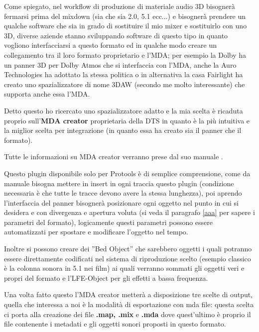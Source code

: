 \documentclass[12pt,a4paper]{report}
\begin{document}
Come spiegato, nel workflow di produzione di materiale audio 3D bisognerà fermarsi prima del mixdown (sia che sia 2.0, 5.1 ecc...) e bisognerà prendere un qualche software che sia in grado di sostituire il mio mixer e sostituirlo con uno 3D, diverse aziende stanno sviluppando software di questo tipo in quanto vogliono interfacciarsi a questo formato ed in qualche modo creare un collegamento tra il loro formato proprietario e l'MDA; per esempio la Dolby ha un panner 3D per Dolby Atmos che si interfaccia con l'MDA, anche la Auro Technologies ha adottato la stessa politica o in alternativa la casa Fairlight ha creato uno spazializzatore di nome 3DAW (secondo me molto interessante) che supporta anche essa l'MDA.

Detto questo ho ricercato uno spazializzatore adatto e la mia scelta è ricaduta proprio sull'\textbf{MDA creator} proprietaria della DTS in quanto è la più intuitiva e la miglior scelta per integrazione (in quanto essa ha creato sia il panner che il formato).

Tutte le informazioni su MDA creator verranno prese dal suo manuale \cite{creator}.

Questo plugin disponibile solo per Protools è di semplice comprensione, come da manuale bisogna mettere in insert in ogni traccia questo plugin (condizione necessaria è che tutte le tracce devono avere la stessa lunghezza), poi aprendo l'interfaccia del panner bisognerà posizionare ogni oggetto nel punto in cui si desidera e con divergenza e apertura voluta (si veda il paragrafo \ref{aaa} per sapere i parametri del formato), logicamente questi parametri possono essere automatizzati per spostare e modificare l'oggetto nel tempo.

Inoltre si possono creare dei ''Bed Object'' che sarebbero oggetti i quali potranno essere direttamente codificati nel sistema di riproduzione scelto (esempio classico è la colonna sonora in 5.1 nei film) ai quali verranno sommati gli oggetti veri e propri del formato e l'LFE-Object per gli effetti a bassa frequenza.

Una volta fatto questo l'MDA creator metterà a disposizione tre scelte di output, quella che interessa a noi è la modalità di esportazione con mda file: questa scelta ci porta alla creazione dei file \textbf{.map, .mix} e \textbf{.mda} dove quest'ultimo è proprio il file contenente i metadati e gli oggetti sonori proposti in questo formato.
\end{document}
